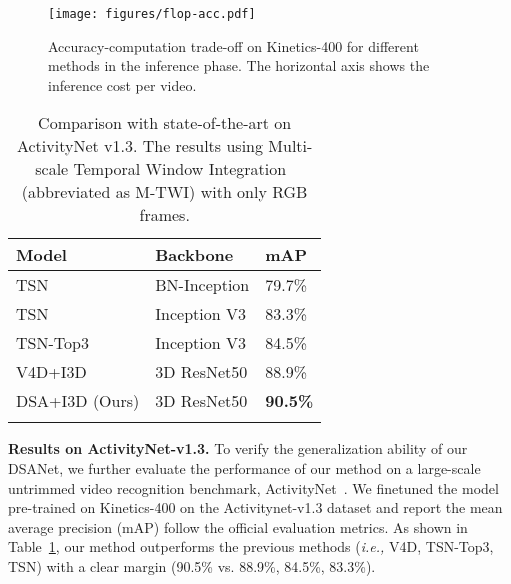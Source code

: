 \documentclass[sigconf]{acmart}
\begin{document}
{{\begin{figure}[t]
    \centering
    \texttt{[image: figures/flop-acc.pdf]}
    \caption{Accuracy-computation trade-off on Kinetics-400 for different methods in the inference phase. The horizontal axis shows the inference cost per video.}   
    \vspace{-8pt}
    \label{fig:cmp_sota}
\end{figure} 





\begin{table}[th]
\centering
\caption{Comparison with state-of-the-art on ActivityNet v1.3. The results using Multi-scale Temporal Window Integration~\cite{tsn} (abbreviated as M-TWI) with only RGB frames.}

\begin{tabular}{l|l|l}
\shline
{Model}& Backbone & mAP\\
\hline
TSN~\cite{tsn} & BN-Inception & 79.7\% \\
TSN~\cite{tsn}& Inception V3 & 83.3\% \\
TSN-Top3~\cite{tsn}& Inception V3 & 84.5\% \\
V4D+I3D~\cite{zhang2020v4d} & {3D ResNet50} & 88.9\%  \\
\hline
DSA+I3D (Ours) & {3D ResNet50} & \textbf{90.5\%} \\
\shline



\end{tabular}
\label{cmp anet}
\end{table} 

\textbf{Results on ActivityNet-v1.3.}
To verify the generalization ability of our DSANet, we further evaluate the performance of our method on a large-scale untrimmed video recognition benchmark, ActivityNet~\cite{caba2015activitynet}. 
We finetuned the model pre-trained on Kinetics-400 on the Activitynet-v1.3 dataset and report the mean average precision (mAP) follow the official evaluation metrics. 
As shown in Table~\ref{cmp anet}, our method outperforms the previous methods (\emph{i.e.,} V4D, TSN-Top3, TSN) with a clear margin (90.5\% vs. 88.9\%, 84.5\%, 83.3\%).




}}
\end{document}
